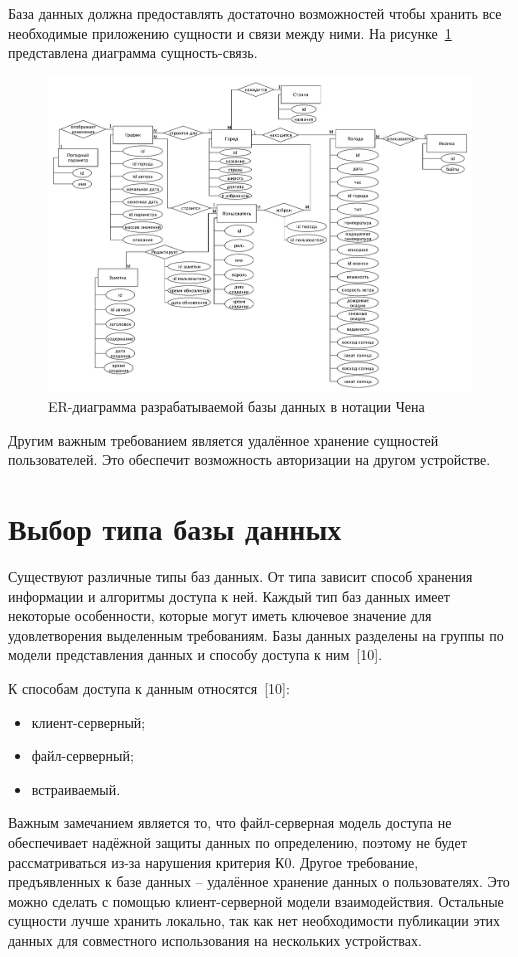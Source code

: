 База данных должна предоставлять достаточно возможностей чтобы хранить все необходимые приложению сущности и связи между ними.
На рисунке~\ref{fig:er-chen} представлена диаграмма сущность-связь.
\begin{figure}[H]
	\centering
	\includegraphics[height=0.55\textheight, width=\textwidth]{tools/img/er-chen.pdf}
	\caption{
        ER-диаграмма разрабатываемой базы данных в нотации Чена
    }
	\label{fig:er-chen}
\end{figure}

Другим важным требованием является удалённое хранение сущностей пользователей.
Это обеспечит возможность авторизации на другом устройстве.

\section{Выбор типа базы данных}
Существуют различные типы баз данных.
От типа зависит способ хранения информации и алгоритмы доступа к ней.
Каждый тип баз данных имеет некоторые особенности, которые могут иметь ключевое значение для удовлетворения выделенным требованиям.
Базы данных разделены на группы по модели представления данных и способу доступа к ним~[10].

К способам доступа к данным относятся~[10]:
\begin{itemize}
    \item клиент-серверный;
    \item файл-серверный;
    \item встраиваемый.
\end{itemize}
Важным замечанием является то, что файл-серверная модель доступа не обеспечивает надёжной защиты данных по определению, поэтому не будет рассматриваться из-за нарушения критерия К0.
Другое требование, предъявленных к базе данных -- удалённое хранение данных о пользователях.
Это можно сделать с помощью клиент-серверной модели взаимодействия.
Остальные сущности лучше хранить локально, так как нет необходимости публикации этих данных для совместного использования на нескольких устройствах.

